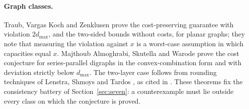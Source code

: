\documentclass[11pt]{article}
\theoremstyle{remark}
\newcommand{\dmax}{d_{\max}}
\begin{document}
\paragraph{Graph classes.} Traub, Vargas Koch and Zenklusen \cite{TVZ24} prove the cost-preserving guarantee with
violation $2\dmax$, and the two-sided bounds without costs, for planar graphs; they note that measuring the
violation against $x$ is a worst-case assumption in which capacities equal $x$. Majthoub Almoghrabi, Skutella and
Warode \cite{MSW25} prove the cost conjecture for series-parallel digraphs in the convex-combination form and with
deviation strictly below $\dmax$. The two-layer case follows from rounding techniques of Lenstra, Shmoys and Tardos
\cite{LST90}, as cited in \cite{TVZ24}. These theorems fix the consistency battery of Section~\ref{sec:seven}: a
counterexample must lie outside every class on which the conjecture is proved.
\end{document}
